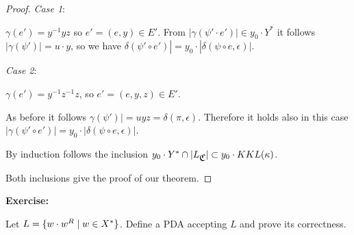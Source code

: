 \begin{proof}
{\em Case 1}:

$\gamma(e') = y^{-1}yz$ so $e' = (e, y) \in E'$. From $|\gamma(\psi' \cdot
e')| \in y_0 \cdot Y^*$ it follows $|\gamma(\psi')| = u \cdot y$, so we have
$\delta(\psi' \circ e')| = y_0 \cdot |\delta(\psi \circ e, \epsilon)|$.

{\em Case 2}:

$\gamma(e') = y^{-1} z^{-1} z$, so $e' = (e, y, z) \in E'$.

As before it follows $\gamma(\psi')| = uyz = \delta(\pi, \epsilon)$. Therefore
it holds also in this case $|\gamma(\psi' \circ e')| = y_0 \cdot |\delta(\psi
\circ e, \epsilon)|$.

By induction follows the inclusion $y_0 \cdot Y^* \cap |L_{\mbox{$\mathfrak{C}$}}| \subset y_0
\cdot KKL(\kappa)$.

Both inclusions give the proof of our theorem.
\end{proof}

{\bf Exercise:}

Let $L = \mbox{$\{ w \cdot w^R \mid w \in X^*\}$}$. Define a PDA accepting $L$ and
prove its correctness.
